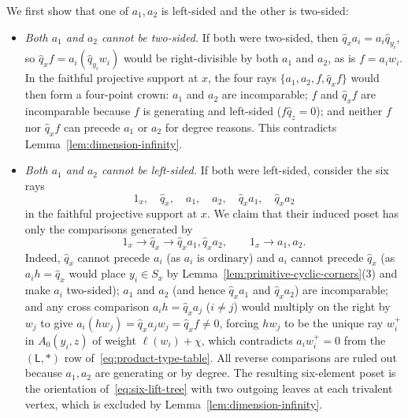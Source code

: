 We first show that one of $a_1,a_2$ is left-sided and the other is two-sided:
\begin{itemize}
\item \emph{Both $a_1$ and $a_2$ cannot be two-sided.} If both were two-sided, then $\widehat q_xa_i=a_i\widehat q_{y_i}$, so $\widehat q_xf=a_i(\widehat q_{y_i}w_i)$ would be right-divisible by both $a_1$ and $a_2$, as is $f=a_iw_i$. In the faithful projective support at $x$, the four rays $\{a_1,a_2,f,\widehat q_xf\}$ would then form a four-point crown: $a_1$ and $a_2$ are incomparable; $f$ and $\widehat q_xf$ are incomparable because $f$ is generating and left-sided ($f\widehat q_z=0$); and neither $f$ nor $\widehat q_xf$ can precede $a_1$ or $a_2$ for degree reasons. This contradicts Lemma~\ref{lem:dimension-infinity}.

\item \emph{Both $a_1$ and $a_2$ cannot be left-sided.} If both were left-sided, consider the six rays
\[
  1_x,\quad \widehat q_x,\quad a_1,\quad a_2,\quad \widehat q_xa_1,\quad \widehat q_xa_2
\]
in the faithful projective support at $x$. We claim that their induced poset has only the comparisons generated by
\[
  1_x\longrightarrow\widehat q_x\longrightarrow\widehat q_xa_1,\widehat q_xa_2,\qquad
  1_x\longrightarrow a_1,a_2.
\]
Indeed, $\widehat q_x$ cannot precede $a_i$ (as $a_i$ is ordinary) and $a_i$ cannot precede $\widehat q_x$ (as $a_ih=\widehat q_x$ would place $y_i\in S_x$ by Lemma~\ref{lem:primitive-cyclic-corners}(3) and make $a_i$ two-sided); $a_1$ and $a_2$ (and hence $\widehat q_xa_1$ and $\widehat q_xa_2$) are incomparable; and any cross comparison $a_ih=\widehat q_xa_j$ ($i\ne j$) would multiply on the right by $w_j$ to give $a_i(hw_j)=\widehat q_xa_jw_j=\widehat q_xf\ne0$, forcing $hw_j$ to be the unique ray $w_i^+$ in $A_0(y_i,z)$ of weight $\ell(w_i)+\chi$, which contradicts $a_iw_i^+=0$ from the $(\mathsf L,*)$ row of~\eqref{eq:product-type-table}. All reverse comparisons are ruled out because $a_1,a_2$ are generating or by degree. The resulting six-element poset is the orientation of~\eqref{eq:six-lift-tree} with two outgoing leaves at each trivalent vertex, which is excluded by Lemma~\ref{lem:dimension-infinity}.
\end{itemize}

